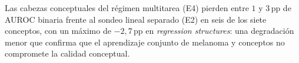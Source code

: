 Las cabezas conceptuales del régimen multitarea (E4) pierden entre
$1$ y $3$\,pp de AUROC binaria frente al sondeo lineal separado
(E2) en seis de los siete conceptos, con un máximo de $-2{,}7$\,pp
en \emph{regression structures}: una degradación menor que confirma
que el aprendizaje conjunto de melanoma y conceptos no compromete la
calidad conceptual.
